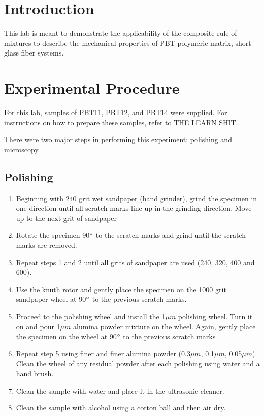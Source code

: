 \documentclass[11pt]{article}
\begin{document}
\tableofcontents
\newpage
\listoffigures
\newpage
\listoftables
\newpage

\section{Introduction}
This lab is meant to demonstrate the applicability of the composite rule of mixtures to describe the mechanical properties of PBT polymeric matrix, short glass fiber systems. 

\section{Experimental Procedure \cite{manual}}
For this lab, samples of PBT11, PBT12, and PBT14 were supplied. For instructions on how to prepare these samples, refer to THE LEARN SHIT.

There were two major steps in performing this experiment: polishing and microscopy.

\subsection{Polishing}
\begin{enumerate}
\item Beginning with 240 grit wet sandpaper (hand grinder), grind the specimen in one direction until all scratch marks line up in the grinding direction. Move up to the next grit of sandpaper

\item Rotate the specimen 90\(\degree\) to the scratch marks and grind until the scratch marks are removed.

\item Repeat steps 1 and 2 until all grits of sandpaper are used (240, 320, 400 and 600).

\item Use the knuth rotor and gently place the specimen on the 1000 grit sandpaper wheel at 90\(\degree\) to the previous scratch marks.

\item Proceed to the polishing wheel and install the 1\(\mu m\) polishing wheel. Turn it on and pour 1\(\mu m\) alumina powder mixture on the wheel. Again, gently place the specimen on the wheel at 90\(\degree\) to the previous scratch marks

\item Repeat step 5 using finer and finer alumina powder (0.3\(\mu m\), 0.1\(\mu m\), 0.05\(\mu m\)). Clean the wheel of any residual powder after each polishing using water and a hand brush.

\item Clean the sample with water and place it in the ultrasonic cleaner.

\item Clean the sample with alcohol using a cotton ball and then air dry.
\end{enumerate}
\end{document}
